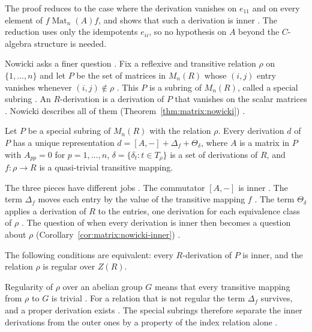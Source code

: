 The proof reduces to the case where the derivation vanishes on $e_{11}$ and on
every element of $f\operatorname{Mat}_n(A)f$, and shows that such a derivation
is inner \cite[p.~209]{Jondrup1995}. The reduction uses only the idempotents
$e_{ii}$, so no hypothesis on $A$ beyond the $C$-algebra structure is needed.

Nowicki asks a finer question \cite[p.~281]{Nowicki1983}. Fix a reflexive and
transitive relation $\rho$ on $\{1,\dots,n\}$ and let $P$ be the set of
matrices in $M_n(R)$ whose $(i,j)$ entry vanishes whenever $(i,j)\notin\rho$
\cite[p.~281]{Nowicki1983}. This $P$ is a subring of $M_n(R)$, called a
special subring \cite[p.~281]{Nowicki1983}. An $R$-derivation is a derivation
of $P$ that vanishes on the scalar matrices \cite[p.~284]{Nowicki1983}.
Nowicki describes all of them (Theorem~\ref{thm:matrix:nowicki})
\cite[p.~287]{Nowicki1983}.

\begin{theorem}\label{thm:matrix:nowicki}
Let $P$ be a special subring of $M_n(R)$ with the relation $\rho$. Every
derivation $d$ of $P$ has a unique representation
$d=[A,-]+\Delta_f+\Theta_\delta$, where $A$ is a matrix in $P$ with
$A_{pp}=0$ for $p=1,\dots,n$, $\delta=\{\delta_t\colon t\in T_\rho\}$ is a set of
derivations of $R$, and $f\colon\rho\to R$ is a quasi-trivial transitive
mapping.
\end{theorem}

The three pieces have different jobs \cite[p.~287]{Nowicki1983}. The commutator
$[A,-]$ is inner \cite[p.~287]{Nowicki1983}. The term $\Delta_f$ moves each entry
by the value of the transitive mapping $f$ \cite[p.~287]{Nowicki1983}. The term
$\Theta_\delta$ applies a derivation of $R$ to the entries, one derivation for
each equivalence class of $\rho$ \cite[p.~287]{Nowicki1983}. The question of
when every derivation is inner then becomes a question about $\rho$ (Corollary~\ref{cor:matrix:nowicki-inner})
\cite[p.~289]{Nowicki1983}.\begin{corollary}\label{cor:matrix:nowicki-inner}
The following conditions are equivalent: every $R$-derivation of $P$ is inner,
and the relation $\rho$ is regular over $Z(R)$.
\end{corollary}

Regularity of $\rho$ over an abelian group $G$ means that every transitive
mapping from $\rho$ to $G$ is trivial \cite[Definition~2.2,
p.~283]{Nowicki1983}. For a relation that is not regular the term $\Delta_f$
survives, and a proper derivation exists \cite[p.~289]{Nowicki1983}. The
special subrings therefore separate the inner derivations from the outer ones
by a property of the index relation alone \cite[p.~289]{Nowicki1983}.


